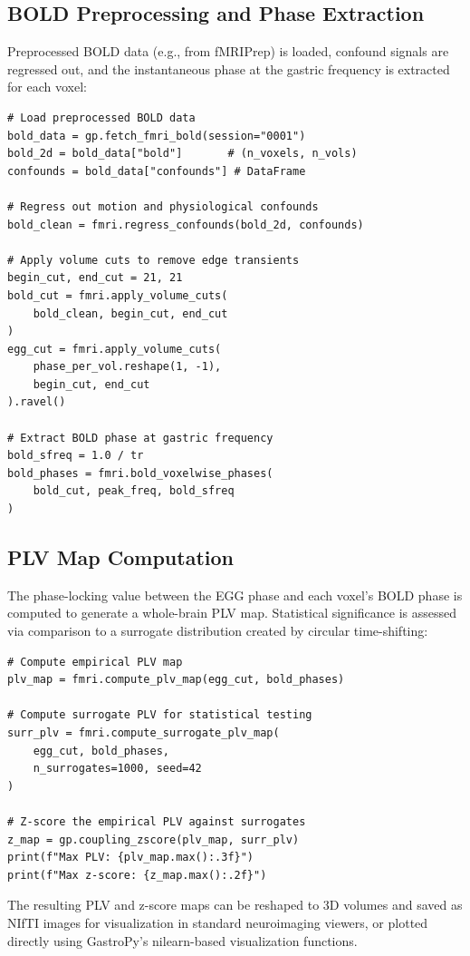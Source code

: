 \documentclass[12pt]{article}
\begin{document}
\subsection{BOLD Preprocessing and Phase Extraction}

Preprocessed BOLD data (e.g., from fMRIPrep) is loaded, confound signals are
regressed out, and the instantaneous phase at the gastric frequency is
extracted for each voxel:

\begin{lstlisting}
# Load preprocessed BOLD data
bold_data = gp.fetch_fmri_bold(session="0001")
bold_2d = bold_data["bold"]       # (n_voxels, n_vols)
confounds = bold_data["confounds"] # DataFrame

# Regress out motion and physiological confounds
bold_clean = fmri.regress_confounds(bold_2d, confounds)

# Apply volume cuts to remove edge transients
begin_cut, end_cut = 21, 21
bold_cut = fmri.apply_volume_cuts(
    bold_clean, begin_cut, end_cut
)
egg_cut = fmri.apply_volume_cuts(
    phase_per_vol.reshape(1, -1),
    begin_cut, end_cut
).ravel()

# Extract BOLD phase at gastric frequency
bold_sfreq = 1.0 / tr
bold_phases = fmri.bold_voxelwise_phases(
    bold_cut, peak_freq, bold_sfreq
)
\end{lstlisting}

\subsection{PLV Map Computation}

The phase-locking value between the EGG phase and each voxel's BOLD phase is
computed to generate a whole-brain PLV map. Statistical significance is
assessed via comparison to a surrogate distribution created by circular
time-shifting:

\begin{lstlisting}
# Compute empirical PLV map
plv_map = fmri.compute_plv_map(egg_cut, bold_phases)

# Compute surrogate PLV for statistical testing
surr_plv = fmri.compute_surrogate_plv_map(
    egg_cut, bold_phases,
    n_surrogates=1000, seed=42
)

# Z-score the empirical PLV against surrogates
z_map = gp.coupling_zscore(plv_map, surr_plv)
print(f"Max PLV: {plv_map.max():.3f}")
print(f"Max z-score: {z_map.max():.2f}")
\end{lstlisting}

The resulting PLV and z-score maps can be reshaped to 3D volumes and saved as
NIfTI images for visualization in standard neuroimaging viewers, or plotted
directly using GastroPy's nilearn-based visualization functions.
\end{document}
